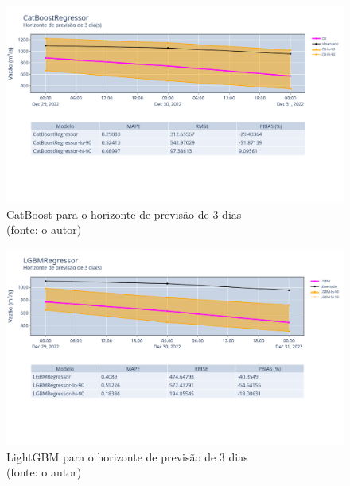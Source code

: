 \begin{figure}[!h]
	\centering
	\includegraphics[scale=0.33]{Figuras/jequiti/resultados/CatBoostRegressor_fh3.png}
	\caption{CatBoost para o horizonte de previsão de 3 dias\\(fonte: o autor)}
	\label{fig:jequiti_CatBoostRegressor_fh3}
\end{figure}

\begin{figure}[!h]
	\centering
	\includegraphics[scale=0.33]{Figuras/jequiti/resultados/LGBMRegressor_fh3.png}
	\caption{LightGBM para o horizonte de previsão de 3 dias\\(fonte: o autor)}
	\label{fig:jequiti_LGBMRegressor_fh3}
\end{figure}

